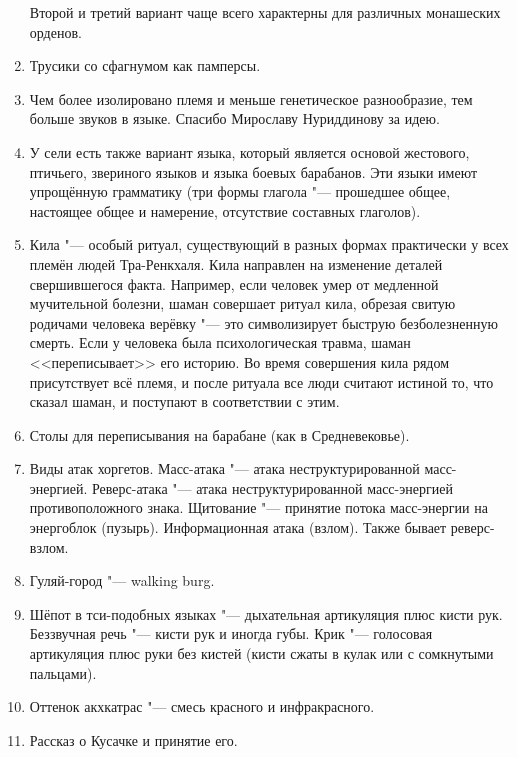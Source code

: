 \begin{enumerate}
Второй и третий вариант чаще всего характерны для различных монашеских орденов.

\item Трусики со сфагнумом как памперсы.

\item Чем более изолировано племя и меньше генетическое разнообразие, тем больше звуков в языке.
Спасибо Мирославу Нуриддинову за идею.

\item У сели есть также вариант языка, который является основой жестового, птичьего, звериного языков и языка боевых барабанов.
Эти языки имеют упрощённую грамматику (три формы глагола "--- прошедшее общее, настоящее общее и намерение, отсутствие составных глаголов).

\item Кила "--- особый ритуал, существующий в разных формах практически у всех племён людей Тра-Ренкхаля.
Кила направлен на изменение деталей свершившегося факта.
Например, если человек умер от медленной мучительной болезни, шаман совершает ритуал кила, обрезая свитую родичами человека верёвку "--- это символизирует быструю безболезненную смерть.
Если у человека была психологическая травма, шаман <<переписывает>> его историю.
Во время совершения кила рядом присутствует всё племя, и после ритуала все люди считают истиной то, что сказал шаман, и поступают в соответствии с этим.

\item Столы для переписывания на барабане (как в Средневековье).

\item Виды атак хоргетов.
Масс-атака "--- атака неструктурированной масс-энергией.
Реверс-атака "--- атака неструктурированной масс-энергией противоположного знака.
Щитование "--- принятие потока масс-энергии на энергоблок (пузырь).
Информационная атака (взлом).
Также бывает реверс-взлом.

\item Гуляй-город "--- walking burg.

\item Шёпот в тси-подобных языках "--- дыхательная артикуляция плюс кисти рук.
Беззвучная речь "--- кисти рук и иногда губы.
Крик "--- голосовая артикуляция плюс руки без кистей (кисти сжаты в кулак или с сомкнутыми пальцами).

\item Оттенок акхкатрас "--- смесь красного и инфракрасного.

\item Рассказ о Кусачке и принятие его.


\end{enumerate}
